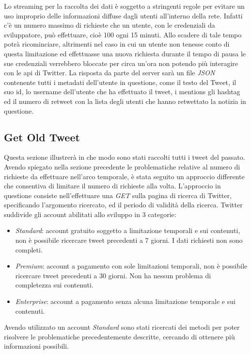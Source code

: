Lo streaming per la raccolta dei dati è soggetto a stringenti regole per evitare un uso improprio delle informazioni diffuse dagli utenti all'interno della rete. Infatti c'è un numero massimo di richieste che un utente, con le credenziali da sviluppatore, può effettuare, cioè 100 ogni 15 minuti. Allo scadere di tale tempo potrà ricominciare, altrimenti nel caso in cui un utente non tenesse conto di questa limitazione ed effettuasse una nuova richiesta durante il tempo di pausa le sue credenziali verrebbero bloccate per circa un'ora non potendo più interagire con le api di Twitter.
La risposta da parte del server sarà un file \textit{JSON} contenente tutti i metadati dell'utente in questione, come il testo del Tweet, il suo id, lo username dell'utente che ha effettuato il tweet, i mentions gli hashtag ed il numero di retweet con la lista degli utenti che hanno retwettato la notizia in questione.

\subsection{Get Old Tweet}
Questa sezione illustrerà in che modo sono stati raccolti tutti i tweet del passato. Avendo spiegato nella sezione precedente le problematiche relative al numero di richieste da effettuare nell'arco temporale, è stata seguito un approccio differente che consentiva di limitare il numero di richieste alla volta.
L'approccio in questione consiste nell'effettuare una \textit{GET} sulla pagina di ricerca di Twitter, specificando l'argomento ricercato, ed il periodo di validità della ricerca.
Twitter suddivide gli account abilitati allo sviluppo in 3 categorie:
\begin{itemize}
\item \textit{Standard}: account gratuito soggetto a limitazione temporali e sui contenuti, non è possibile ricercare tweet precedenti a 7 giorni. I dati richiesti non sono completi.
\item \textit{Premium}: account a pagamento con sole limitazioni temporali, non è possibile ricercare tweet precedenti a 30 giorni. Non ha nessun problema di completezza sui contenuti.
\item \textit{Enterprise}: account a pagamento senza alcuna limitazione temporale e sui contenuti.
\end{itemize}
Avendo utilizzato un account \textit{Standard} sono stati ricercati dei metodi per poter risolvere le problematiche precedentemente descritte, cercando di ottenere più informazioni possibili.

